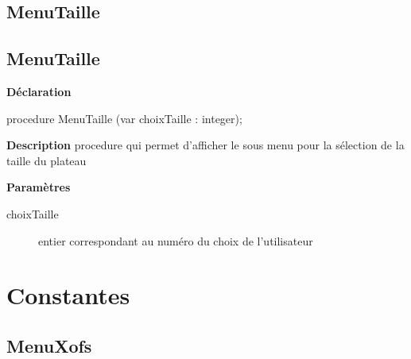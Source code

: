 \documentclass{report}
\newif\ifpdf
\begin{document}
\subsection*{\large{\textbf{MenuTaille}}\normalsize\hspace{1ex}\hrulefill}
\else
\subsection*{MenuTaille}
\fi
\label{LesMenus-MenuTaille}
\begin{list}{}{
\setlength{\itemindent}{0cm}
\setlength{\listparindent}{0cm}
\setlength{\leftmargin}{\evensidemargin}
\addtolength{\leftmargin}{\tmplength}
\settowidth{\labelsep}{X}
\addtolength{\leftmargin}{\labelsep}
\setlength{\labelwidth}{\tmplength}
}
\item[\textbf{Déclaration}\hfill]
\ifpdf
\begin{flushleft}
\fi
\begin{ttfamily}
procedure MenuTaille (var choixTaille : integer);\end{ttfamily}

\ifpdf
\end{flushleft}
\fi

\par
\item[\textbf{Description}]
procedure qui permet d'afficher le sous menu pour la sélection de la taille du plateau \par
\item[\textbf{Paramètres}]
\begin{description}
\item[choixTaille] entier correspondant au numéro du choix de l'utilisateur
\end{description}


\end{list}
\section{Constantes}
\ifpdf
\subsection*{\large{\textbf{MenuXofs}}\normalsize\hspace{1ex}\hrulefill}
\else
\end{document}
